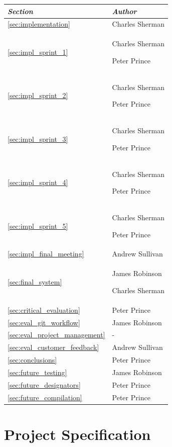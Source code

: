 \documentclass[a4paper, 12pt, twoside]{article}
\newcommand*{\fullref}[1]{\ref{#1} \nameref{#1}}
\begin{document}
\begin{tabularx}{\textwidth}{|X|X|} \hline
  \emph{Section}                         & \emph{Author}                      \\ \hline
  \fullref{sec:implementation}           & Charles Sherman                    \\
  \fullref{sec:impl_sprint_1}            & Charles Sherman\par Peter Prince   \\
  \fullref{sec:impl_sprint_2}            & Charles Sherman\par Peter Prince   \\
  \fullref{sec:impl_sprint_3}            & Charles Sherman\par Peter Prince   \\
  \fullref{sec:impl_sprint_4}            & Charles Sherman\par Peter Prince   \\
  \fullref{sec:impl_sprint_5}            & Charles Sherman\par Peter Prince   \\
  \fullref{sec:impl_final_meeting}       & Andrew Sullivan                    \\ \hline
  \fullref{sec:final_system}             & James Robinson\par Charles Sherman \\ \hline
  \fullref{sec:critical_evaluation}      & Peter Prince                       \\
  \fullref{sec:eval_git_workflow}        & James Robinson                     \\
  \fullref{sec:eval_project_management}  & -                                  \\
  \fullref{sec:eval_customer_feedback}   & Andrew Sullivan                    \\ \hline
  \fullref{sec:conclusions}              & Peter Prince                       \\ \hline
  \fullref{sec:future_testing}           & James Robinson                     \\
  \fullref{sec:future_designators}       & Peter Prince                       \\
  \fullref{sec:future_compilation}       & Peter Prince                       \\ \hline
\end{tabularx}

\section{Project Specification}
\end{document}
